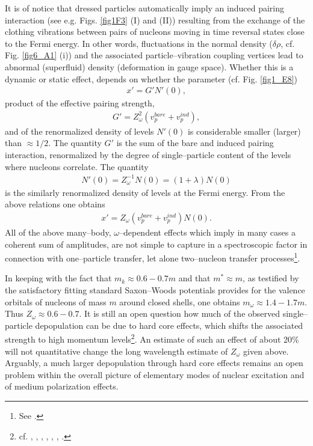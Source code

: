It is of notice that dressed particles automatically imply an induced pairing interaction (see e.g. Figs. \ref{fig1F3} (I) and (II)) resulting from the exchange of the clothing vibrations between pairs of nucleons moving in time reversal states close to the Fermi energy. In other words, fluctuations in the normal density ($\delta \rho$, cf. Fig. \ref{fig6_A1} (i)) and the associated particle--vibration coupling vertices lead to abnormal (superfluid) density (deformation in gauge space). Whether this is a dynamic or static effect, depends on whether the parameter (cf. Fig. \ref{fig1_E8}) 
\begin{align}\label{eq2_1_10}
x'=G'N'(0),  
\end{align}
product of the effective pairing strength, 
\begin{align}\label{eq2_2_2}
G'=Z_\omega^2(v_p^{bare}+v_p^{ind}),
\end{align}
and of the renormalized density of levels $N'(0)$ is considerable smaller  (larger) than $\approx1/2$. The quantity $G'$ is the sum of the bare and induced pairing interaction, renormalized by the degree of single--particle content of the levels where nucleons correlate. The quantity 
\begin{align}
N'(0)=Z_\omega^{-1}N(0)=(1+\lambda)N(0)
\end{align}
is the similarly renormalized density of levels at the Fermi energy. From the above relations one obtains 
\begin{align}
x'=Z_\omega(v_p^{bare}+v_p^{ind})N(0).
\end{align}
All of the above many--body, $\omega$--dependent effects which imply in many cases a coherent sum of amplitudes, are not simple to capture in a spectroscopic factor in connection with one--particle transfer, let alone two--nucleon transfer processes\footnote{See \cite{Barranco:05}.}. 



In keeping with the fact that $m_k\approx 0.6-0.7 m$ and that $m^*\approx m$, as testified by the satisfactory fitting standard Saxon--Woods potentials provides for the valence orbitals of nucleons of mass $m$ around closed shells, one obtains $m_\omega\approx 1.4-1.7 m$. Thus $Z_\omega \approx 0.6-0.7$. It is still an open question how much of the observed single--particle depopulation can be due to hard core effects, which shifts the associated strength to high momentum levels\footnote{cf. \cite{Dickhoff:05}, \cite{Jenning:11}, \cite{Kramer:01}, \cite{Barbieri:09}, \cite{Schiffer:12}, \cite{Duguet:12}, \cite{Furnstahl:10}.}.  An estimate of such an effect of about 20\% will not quantitative change the long wavelength estimate of $Z_\omega$ given above. Arguably, a much larger depopulation through hard core effects remains an open problem within the overall picture of elementary modes of nuclear excitation and of medium polarization effects.


